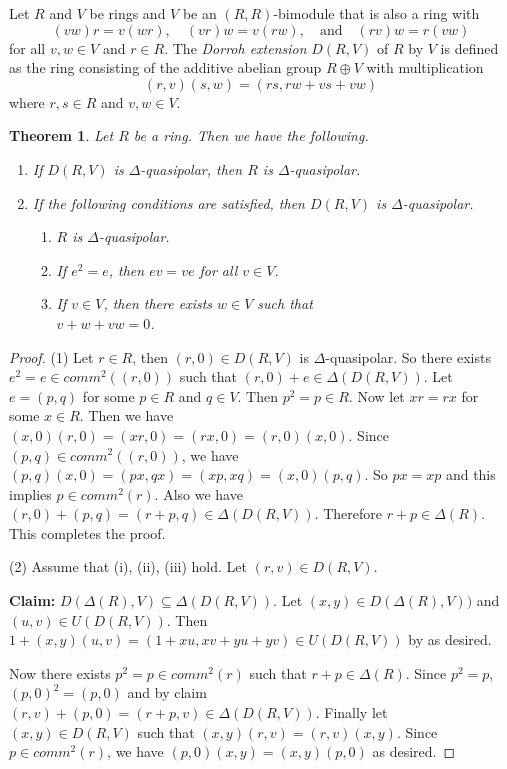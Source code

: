 \documentclass[12pt, reqno]{amsart}
\newtheorem{thm}{Theorem}[section]
\numberwithin{equation}{section}
\begin{document}
Let $R$ and $V$ be rings and $V$ be an $(R,R)$-bimodule that is also a ring with
$$
(vw)r = v(wr), \quad (vr)w = v(rw), \quad \text{and} \quad (rv)w = r(vw)
$$
for all $v, w \in V$ and $r \in R$. The \textit{Dorroh extension} $D(R,V)$ of $R$ by $V$ is defined as the ring consisting of the additive abelian group $R \oplus V$ with multiplication
$$
(r,v)(s,w) = (rs, rw + vs + vw)
$$
where $r, s \in R$ and $v, w \in V$.

\begin{thm}
    Let $R$ be a ring. Then we have the following.
    \begin{enumerate}
        \item If $D(R,V)$ is $\Delta$-quasipolar, then $R$ is $\Delta$-quasipolar.
        \item If the following conditions are satisfied, then $D(R,V)$ is $\Delta$-quasipolar.
        \begin{enumerate}
            \item[(i)] $R$ is $\Delta$-quasipolar.
            \item[(ii)] If $e^2=e$, then $ev=ve$ for all $v\in V$.
            \item[(iii)] If $v\in V$, then there exists $w\in V$ such that \\$v+w+vw=0$. 
        \end{enumerate}
    \end{enumerate}
\end{thm}

\begin{proof}
    (1) Let $r\in R$, then $(r,0)\in D(R,V)$ is $\Delta$-quasipolar. So there exists $e^2=e\in comm^2((r,0))$ such that $(r,0)+e\in \Delta(D(R,V))$. Let $e=(p,q)$ for some $p\in R$ and $q \in V$. Then $p^2=p\in R$. Now let $xr=rx$ for some $x\in R$. Then we have $(x,0)(r,0)=(xr,0)=(rx,0)=(r,0)(x,0)$. Since $(p,q)\in comm^2((r,0))$, we have $(p,q)(x,0)=(px,qx)=(xp,xq)=(x,0)(p,q)$. So $px=xp$ and this implies $p\in comm^2(r)$. Also we have $(r,0)+(p,q)=(r+p,q)\in \Delta(D(R,V))$. Therefore $r+p\in \Delta(R)$. This completes the proof.

    (2) Assume that (i), (ii), (iii) hold. Let $(r,v)\in D(R,V)$. 


    \textbf{Claim:} $D(\Delta(R),V)\subseteq \Delta(D(R,V))$. Let $(x,y)\in D(\Delta(R),V))$ and $(u,v)\in U(D(R,V))$. Then $1+(x,y)(u,v)=(1+xu,xv+yu+yv)\in U(D(R,V))$ by \cite[Proposition 7]{Zhou} as desired.

    Now there exists $p^2=p\in comm^2(r)$ such that $r+p\in \Delta(R)$. Since $p^2=p$, $(p,0)^2=(p,0)$ and by claim $(r,v)+(p,0)=(r+p,v)\in \Delta(D(R,V))$. Finally let $(x,y)\in D(R,V)$ such that $(x,y)(r,v)=(r,v)(x,y)$. Since $p\in comm^2(r)$, we have $(p,0)(x,y)=(x,y)(p,0)$ as desired.
\end{proof}
\end{document}
